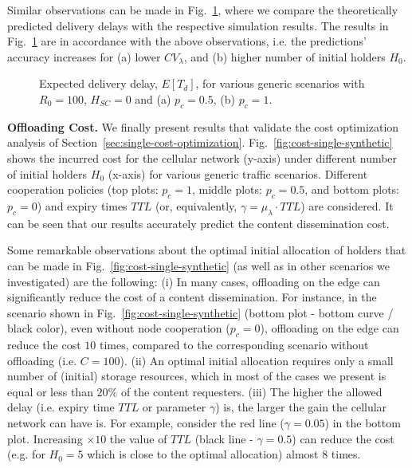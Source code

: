\documentclass[10pt,conference,letterpaper]{IEEEtran}
\begin{document}
Similar observations can be made in Fig.~\ref{fig:synthetic-Delay}, where we compare the theoretically predicted delivery delays with the respective simulation results. The results in Fig.~\ref{fig:synthetic-Delay} are in accordance with the above observations, i.e. the predictions' accuracy increases for (a) lower $CV_{\lambda}$, and (b) higher number of initial holders $H_{0}$.

\begin{figure}
\caption{Expected delivery delay, $E[T_{d}]$, for various generic scenarios with $R_{0}=100$, $H_{SC}=0$ and (a) $p_{c}=0.5$, (b) $p_{c}=1$.}
\label{fig:synthetic-Delay}
\end{figure}

\textbf{Offloading Cost.} We finally present results that validate the cost optimization analysis of Section~\ref{sec:single-cost-optimization}. Fig.~\ref{fig:cost-single-synthetic} shows the incurred cost for the cellular network (y-axis) under different number of initial holders $H_{0}$ (x-axis) for various generic traffic scenarios. Different cooperation policies (top plots: $p_{c}=1$, middle plots: $p_{c}=0.5$, and bottom plots: $p_{c}=0$) and expiry times $TTL$ (or, equivalently, $\gamma = \mu_{\lambda}\cdot TTL$) are considered. It can be seen that our results accurately predict the content dissemination cost.

Some remarkable observations about the optimal initial allocation of holders that can be made in Fig.~\ref{fig:cost-single-synthetic} (as well as in other scenarios we investigated) are the following: (i) In many cases, offloading on the edge can significantly reduce the cost of a content dissemination. For instance, in the scenario shown in Fig.~\ref{fig:cost-single-synthetic} (bottom plot - bottom curve / black color), even without node cooperation ($p_{c}=0$), offloading on the edge can reduce the cost $10$ times, compared to the corresponding scenario without offloading (i.e. $C=100$). (ii) An optimal initial allocation requires only a small number of (initial) storage resources, which in most of the cases we present is equal or less than $20\%$ of the content requesters. (iii) The higher the allowed delay (i.e. expiry time $TTL$ or parameter $\gamma$) is, the larger the gain the cellular network can have is. For example, consider the red line ($\gamma =0.05 $) in the bottom plot. Increasing $\times10$ the value of $TTL$ (black line - $\gamma = 0.5$) can reduce the cost (e.g. for $H_{0}=5$ which is close to the optimal allocation) almost $8$ times.
\end{document}
